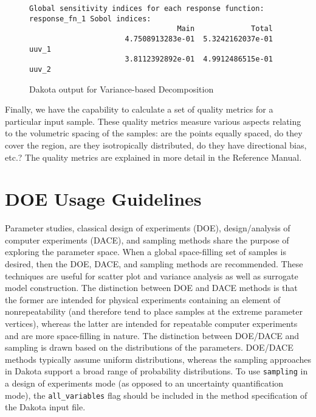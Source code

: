 \begin{figure}[ht!]
\centering
\begin{bigbox}
\begin{small}
\begin{verbatim}
Global sensitivity indices for each response function:
response_fn_1 Sobol indices:
                                  Main             Total
                      4.7508913283e-01  5.3242162037e-01 uuv_1
                      3.8112392892e-01  4.9912486515e-01 uuv_2
\end{verbatim}
\end{small}
\end{bigbox}
\caption{Dakota output for Variance-based Decomposition} 
\label{fig:dace:vbd}
\end{figure}

Finally, we have the capability to calculate a set of quality metrics 
for a particular input sample.  These quality metrics measure 
various aspects relating to the volumetric spacing of the samples: 
are the points equally spaced, do they cover the region, are they 
isotropically distributed, do they have directional bias, etc.? 
The quality metrics are explained in more detail in the Reference Manual.

\section{DOE Usage Guidelines}\label{dace:usage}

Parameter studies, classical design of experiments (DOE),
design/analysis of computer experiments (DACE), and sampling methods
share the purpose of exploring the parameter space.  When a global
space-filling set of samples is desired, then the DOE, DACE, and
sampling methods are recommended.  These techniques are useful for
scatter plot and variance analysis as well as surrogate model
construction. The distinction between DOE and DACE methods is that the
former are intended for physical experiments containing an element of
nonrepeatability (and therefore tend to place samples at the extreme
parameter vertices), whereas the latter are intended for repeatable
computer experiments and are more space-filling in nature. The
distinction between DOE/DACE and sampling is drawn based on the
distributions of the parameters.  DOE/DACE methods typically assume
uniform distributions, whereas the sampling approaches in Dakota
support a broad range of probability distributions. To use
\texttt{sampling} in a design of experiments mode (as opposed to an
uncertainty quantification mode), the \texttt{all\_variables} flag
should be included in the method specification of the Dakota input
file.

